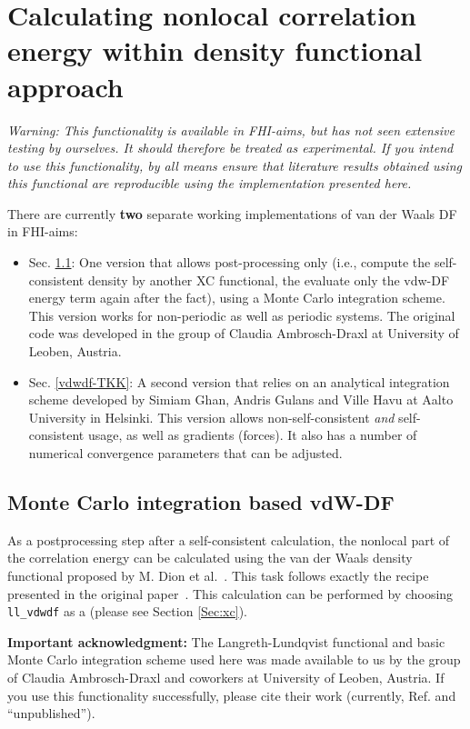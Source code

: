 \section{Calculating nonlocal correlation energy within density functional approach}
\label{Sec:vdwdf}

\emph{Warning: This functionality is available in FHI-aims, but has not seen
  extensive testing by ourselves. It should therefore be treated as
  experimental. If you intend to use this functionality, by all means
  ensure that literature results obtained using this functional are
  reproducible using the implementation presented here.} 

There are currently \textbf{two} separate working implementations of
van der Waals DF in FHI-aims:
\begin{itemize}
  \item Sec. \ref{vdwdf-MC}: One version that allows post-processing 
    only (i.e., compute the self-consistent density by another XC
    functional, the evaluate only the vdw-DF energy term again after
    the fact), using a Monte Carlo integration scheme. This version
    works for non-periodic as well as periodic systems. The original
    code was developed in the group of Claudia Ambrosch-Draxl at
    University of Leoben, Austria.
  \item Sec. \ref{vdwdf-TKK}: A second version that relies on an
    analytical integration scheme developed by Simiam Ghan, Andris
    Gulans and Ville Havu at Aalto University in Helsinki. This
    version allows non-self-consistent \emph{and} self-consistent
    usage, as well as gradients (forces). It also has a number of
    numerical convergence parameters that can be adjusted.
\end{itemize}

\subsection{Monte Carlo integration based vdW-DF}
\label{vdwdf-MC}

As a postprocessing step after a self-consistent calculation, the nonlocal
part of the correlation energy can be calculated using the van der Waals
density functional proposed by M. Dion et al.~\cite{Dion04}. This task follows
exactly the recipe presented in the original paper~\cite{Dion04}. This
calculation can be performed by choosing \texttt{ll\_vdwdf} as a
 (please see Section \ref{Sec:xc}).

\textbf{Important acknowledgment:} The Langreth-Lundqvist functional and basic
Monte Carlo integration scheme used here was made available to us by the group
of Claudia Ambrosch-Draxl and coworkers at University of Leoben, Austria. If
you use this functionality successfully, please cite their work (currently,
Ref. \cite{Nabok08} and ``unpublished'').

